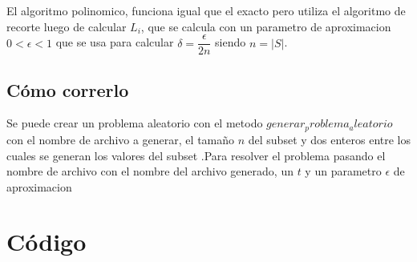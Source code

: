 \documentclass[a4paper,10pt]{article}
\begin{document}
El algoritmo polinomico, funciona igual que el exacto pero utiliza el algoritmo de recorte luego de calcular $L_i$, que se calcula con un parametro de aproximacion $0 < \epsilon < 1$ que se usa para calcular $\delta = \dfrac{\epsilon} {2n}$ siendo $n=|S|$.



\subsection{Cómo correrlo}
 Se puede crear un problema aleatorio con el metodo $generar_problema_aleatorio$ con el nombre de archivo a generar, el tamaño $n$ del subset y dos enteros entre los cuales se generan los valores del subset .Para resolver el problema pasando  el nombre de archivo con el nombre del archivo generado, un $t$ y un parametro $\epsilon$ de aproximacion

\pagebreak

\newpage
\section{Código}
\lstset{
	language=Python, columns=flexible, breaklines=true, frame=single, title=creador\_grafos.py
}


\lstset{ title=grafo.py }


\lstset{ title=karger.py }


\lstset{ title=parser.py }


\lstset{ title=pg.py }


\lstset{ title=pg\_test.py }


\lstset{ title=subset\_sum.py }

\end{document}
